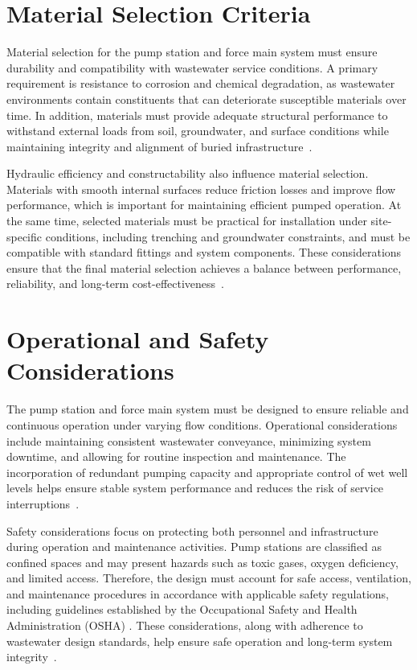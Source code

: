 \section{Material Selection Criteria}

Material selection for the pump station and force main system must ensure durability and compatibility with wastewater service conditions. A primary requirement is resistance to corrosion and chemical degradation, as wastewater environments contain constituents that can deteriorate susceptible materials over time. In addition, materials must provide adequate structural performance to withstand external loads from soil, groundwater, and surface conditions while maintaining integrity and alignment of buried infrastructure~\cite{MDEQ_DesignGuidance_2025,TenStates_RecommendedStandards_2014}.

Hydraulic efficiency and constructability also influence material selection. Materials with smooth internal surfaces reduce friction losses and improve flow performance, which is important for maintaining efficient pumped operation. At the same time, selected materials must be practical for installation under site-specific conditions, including trenching and groundwater constraints, and must be compatible with standard fittings and system components. These considerations ensure that the final material selection achieves a balance between performance, reliability, and long-term cost-effectiveness~\cite{MDEQ_DesignGuidance_2025}.


\section{Operational and Safety Considerations}

The pump station and force main system must be designed to ensure reliable and continuous operation under varying flow conditions. Operational considerations include maintaining consistent wastewater conveyance, minimizing system downtime, and allowing for routine inspection and maintenance. The incorporation of redundant pumping capacity and appropriate control of wet well levels helps ensure stable system performance and reduces the risk of service interruptions~\cite{TenStates_RecommendedStandards_2014,MDEQ_DesignGuidance_2025}.

Safety considerations focus on protecting both personnel and infrastructure during operation and maintenance activities. Pump stations are classified as confined spaces and may present hazards such as toxic gases, oxygen deficiency, and limited access. Therefore, the design must account for safe access, ventilation, and maintenance procedures in accordance with applicable safety regulations, including guidelines established by the Occupational Safety and Health Administration (OSHA) \cite{OSHA_ConfinedSpace_2024}. These considerations, along with adherence to wastewater design standards, help ensure safe operation and long-term system integrity~\cite{MDEQ_DesignGuidance_2025}.
